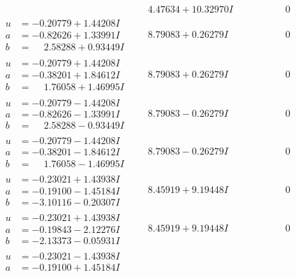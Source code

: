 \documentclass[1p]{elsarticle_modified}
\theoremstyle{definition}
\begin{document}
$$\begin{array}{c|c|c}
 & \phantom{-}4.47634 + 10.32970 I & \phantom{-0.000000 } 0 \\ \hline\begin{aligned}
u &= -0.20779 + 1.44208 I \\
a &= -0.82626 + 1.33991 I \\
b &= \phantom{-}2.58288 + 0.93449 I\end{aligned}
 & \phantom{-}8.79083 + 0.26279 I & \phantom{-0.000000 } 0 \\ \hline\begin{aligned}
u &= -0.20779 + 1.44208 I \\
a &= -0.38201 + 1.84612 I \\
b &= \phantom{-}1.76058 + 1.46995 I\end{aligned}
 & \phantom{-}8.79083 + 0.26279 I & \phantom{-0.000000 } 0 \\ \hline\begin{aligned}
u &= -0.20779 - 1.44208 I \\
a &= -0.82626 - 1.33991 I \\
b &= \phantom{-}2.58288 - 0.93449 I\end{aligned}
 & \phantom{-}8.79083 - 0.26279 I & \phantom{-0.000000 } 0 \\ \hline\begin{aligned}
u &= -0.20779 - 1.44208 I \\
a &= -0.38201 - 1.84612 I \\
b &= \phantom{-}1.76058 - 1.46995 I\end{aligned}
 & \phantom{-}8.79083 - 0.26279 I & \phantom{-0.000000 } 0 \\ \hline\begin{aligned}
u &= -0.23021 + 1.43938 I \\
a &= -0.19100 - 1.45184 I \\
b &= -3.10116 - 0.20307 I\end{aligned}
 & \phantom{-}8.45919 + 9.19448 I & \phantom{-0.000000 } 0 \\ \hline\begin{aligned}
u &= -0.23021 + 1.43938 I \\
a &= -0.19843 - 2.12276 I \\
b &= -2.13373 - 0.05931 I\end{aligned}
 & \phantom{-}8.45919 + 9.19448 I & \phantom{-0.000000 } 0 \\ \hline\begin{aligned}
u &= -0.23021 - 1.43938 I \\
a &= -0.19100 + 1.45184 I \\

\end{aligned}
\end{array}$$
\end{document}
